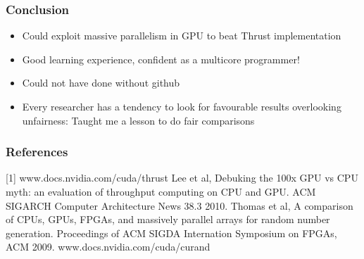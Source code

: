 \documentclass[mathserif]{beamer}
\begin{document}
\begin{frame}                                                                                                                                                                          
\frametitle{Conclusion}
\begin{center}
\begin{itemize}
\item Could exploit massive parallelism in GPU to beat Thrust implementation 
\item Good learning experience, confident as a multicore programmer!
\item Could not have done without github
\item Every researcher has a tendency to look for favourable results overlooking unfairness: Taught me a lesson to do fair comparisons 
\end{itemize}
\end{center}
\end{frame}             


\begin{frame}                                                                                                                                                                          
\frametitle{References}
[1] www.docs.nvidia.com/cuda/thrust \newline
[2] Lee et al, Debuking the 100x GPU vs CPU myth: an evaluation of throughput computing on CPU and GPU. ACM SIGARCH Computer Architecture News 38.3 2010. \newline
[3] Thomas et al, A comparison of CPUs, GPUs, FPGAs, and massively parallel arrays for random number generation. Proceedings of ACM SIGDA Internation Symposium on FPGAs, ACM 2009. \newline
[4] www.docs.nvidia.com/cuda/curand
\end{frame}             

\begin{frame}
\frametitle{}
\begin{block}{}
 \\
\end{block}
\end{frame}

 
\end{document}
